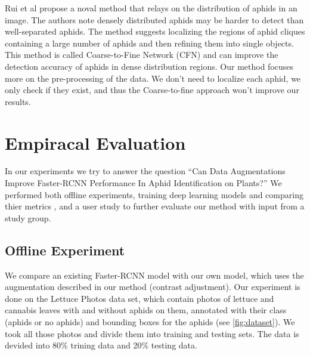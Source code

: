 \documentclass{article}
\begin{document}
Rui et al \cite{CoarseToFine} propose a noval method that relays on the distribution of aphids in an image. 
The authors note densely distributed aphids may be harder to detect than well-separated aphids. 
The method suggests localizing the regions of aphid cliques containing a large number of 
aphids and then refining them into single objects. This method is called 
Coarse-to-Fine Network (CFN) and can improve the detection accuracy of aphids in dense 
distribution regions. Our method focuses more on the pre-processing of the data. 
We don't need to localize each aphid, we only check if they exist, and thus the Coarse-to-fine 
approach won't improve our results.

\section{Empiracal Evaluation}
In our experiments we try to answer the question “Can Data Augmentations Improve Faster-RCNN Performance In Aphid Identification on Plants?”
We performed both offline experiments, training deep learning models and comparing thier metrics
, and a user study to further evaluate our method with input from a study group. 

\subsection{Offline Experiment}
We compare an existing Faster-RCNN model with our own model, which uses the augmentation described in our method (contrast adjustment).
Our experiment is done on the Lettuce Photos data set, which contain photos of lettuce and cannabis leaves with and without aphids on them, 
annotated with their class (aphids or no aphids) and bounding boxes for the aphids (see \ref{fig:dataset}).
We took all those photos and divide them into training and testing sets. The data is devided into 80\% trining data and 
20\% testing data.
\end{document}
